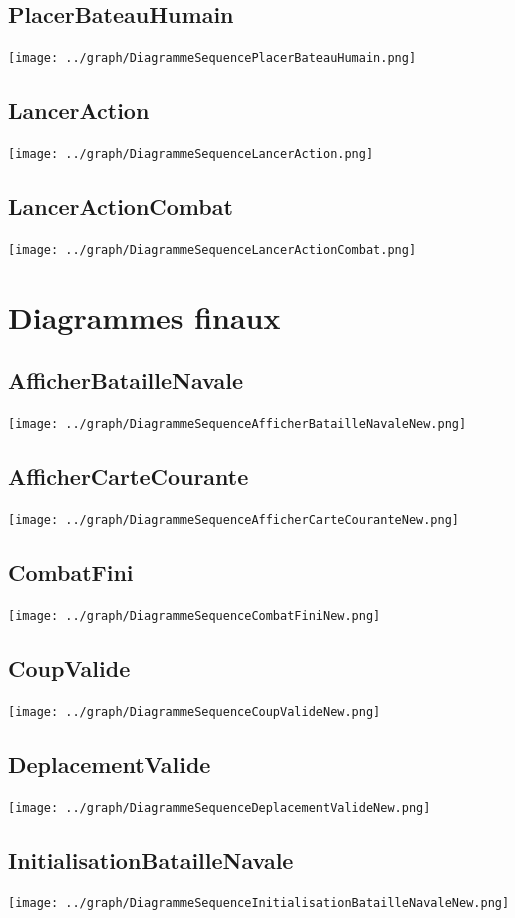         \subsection{PlacerBateauHumain}
            \texttt{[image: ../graph/DiagrammeSequencePlacerBateauHumain.png]}
        \subsection{LancerAction}
            \texttt{[image: ../graph/DiagrammeSequenceLancerAction.png]}
        \subsection{LancerActionCombat}
            \texttt{[image: ../graph/DiagrammeSequenceLancerActionCombat.png]}


    \section{Diagrammes finaux}
        \subsection{AfficherBatailleNavale}
            \texttt{[image: ../graph/DiagrammeSequenceAfficherBatailleNavaleNew.png]}
        \subsection{AfficherCarteCourante}
            \texttt{[image: ../graph/DiagrammeSequenceAfficherCarteCouranteNew.png]}
        \subsection{CombatFini}
            \texttt{[image: ../graph/DiagrammeSequenceCombatFiniNew.png]}
        \subsection{CoupValide}
            \texttt{[image: ../graph/DiagrammeSequenceCoupValideNew.png]}
        \subsection{DeplacementValide}
            \texttt{[image: ../graph/DiagrammeSequenceDeplacementValideNew.png]}
        \subsection{InitialisationBatailleNavale}
            \texttt{[image: ../graph/DiagrammeSequenceInitialisationBatailleNavaleNew.png]}
